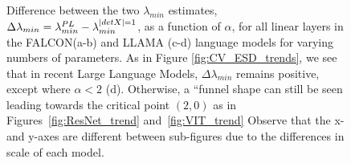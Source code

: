 \begin{figure}[t] %
    \centering
    \caption{Difference between the two $\lambda_{min}$ estimates, $\Delta\lambda_{min} = \lambda^{PL}_{min} - \lambda^{\vert detX\vert=1}_{min}$, 
        as a function of $\alpha$, for all linear layers in the FALCON\cite{falcon40b}(a-b) and 
        LLAMA \cite{touvron2023_TR}(c-d) language models for varying numbers of parameters. As in Figure 
        \ref{fig:CV_ESD_trends}, we see that in recent Large Language Models, $\Delta\lambda_{min}$ remains positive, 
        except where $\alpha < 2$ (d). Otherwise, a ``funnel shape can still be seen leading towards the critical 
        point $(2, 0)$ as in Figures~\ref{fig:ResNet_trend} and~\ref{fig:VIT_trend} Observe that the x- and y-axes are 
        different between sub-figures due to the differences in scale of each model.
    }
  \label{fig:LLM_ESD_trends}
\end{figure}

